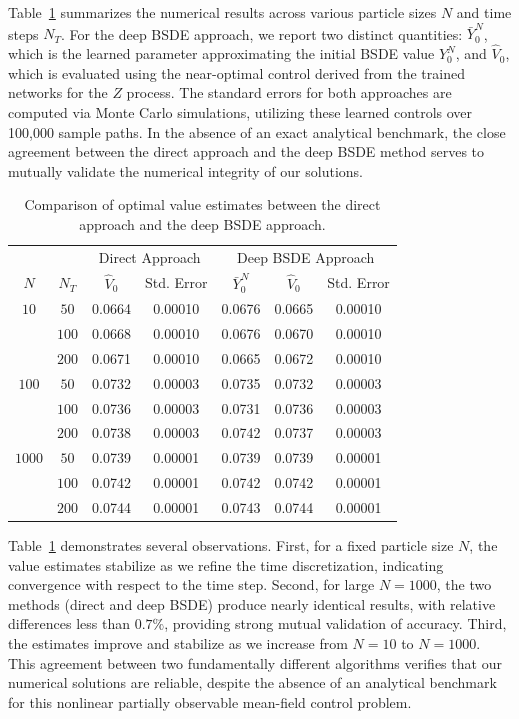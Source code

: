 \documentclass[11pt]{article}
\numberwithin{equation}{section}
\theoremstyle{plain}
\theoremstyle{definition}
\theoremstyle{remark}
\begin{document}
	Table~\ref{tab:lq2-comparison} summarizes the numerical results across various particle sizes $N$ and time steps $N_T$. For the deep BSDE approach, we report two distinct quantities: $\bar{Y}_0^N$, which is the learned parameter approximating the initial BSDE value $Y_0^N$, and $\hat{V}_0$, which is evaluated using the near-optimal control derived from the trained networks for the $Z$ process. The standard errors for both approaches are computed via Monte Carlo simulations, utilizing these learned controls over 100,000 sample paths. In the absence of an exact analytical benchmark, the close agreement between the direct approach and the deep BSDE method serves to mutually validate the numerical integrity of our solutions. 
	
	\begin{table}[htbp!]
		\centering
		\begin{tabular}{cc|cc|ccc}
			\hline
			& & \multicolumn{2}{c|}{Direct Approach} & \multicolumn{3}{c}{Deep BSDE Approach} \\
			$N$ & $N_T$ & $\hat{V}_0$ & Std. Error & $\bar{Y}_0^N$ & $\hat{V}_0$ & Std. Error \\
			\hline
			$10$ & $50$ & 0.0664 & 0.00010  & 0.0676 & 0.0665 & 0.00010 \\
			& $100$ & 0.0668 & 0.00010  & 0.0676 & 0.0670 & 0.00010 \\
			& $200$ & 0.0671 & 0.00010  & 0.0665 & 0.0672 & 0.00010 \\
			\hline
			$100$ & $50$ & 0.0732 & 0.00003  & 0.0735 & 0.0732 & 0.00003 \\
			& $100$ & 0.0736 & 0.00003  & 0.0731 & 0.0736 & 0.00003 \\
			& $200$ & 0.0738 & 0.00003  & 0.0742 & 0.0737 & 0.00003 \\
			\hline
			$1000$ & $50$ & 0.0739 & 0.00001 & 0.0739 & 0.0739 & 0.00001 \\
			& $100$ & 0.0742 & 0.00001 & 0.0742 & 0.0742 & 0.00001 \\
			& $200$ & 0.0744 & 0.00001 & 0.0743 & 0.0744 & 0.00001 \\
			\hline
		\end{tabular}
		\caption{Comparison of optimal value estimates between the direct approach and the deep BSDE approach.}
		\label{tab:lq2-comparison}
	\end{table}
	
	Table~\ref{tab:lq2-comparison} demonstrates several observations. First, for a fixed particle size $N$, the value estimates stabilize as we refine the time discretization, indicating convergence with respect to the time step. Second, for large $N = 1000$, the two methods (direct and deep BSDE) produce nearly identical results, with relative differences less than $0.7\%$, providing strong mutual validation of accuracy. Third, the estimates improve and stabilize as we increase from $N=10$ to $N=1000$. This agreement between two fundamentally different algorithms verifies that our numerical solutions are reliable, despite the absence of an analytical benchmark for this nonlinear partially observable mean-field control problem. 
	
\end{document}
